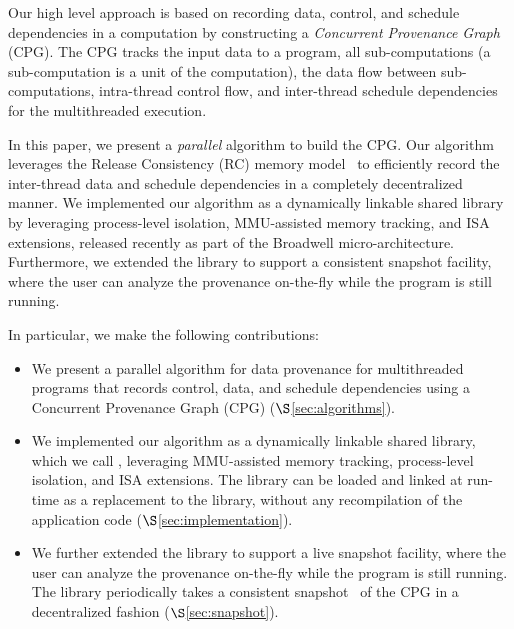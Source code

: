 Our high level approach is based on recording data, control, and schedule dependencies in a computation by constructing a {\em Concurrent Provenance Graph} (CPG). The CPG tracks the input data to a program, all sub-computations (a sub-computation is a unit of the computation), the data flow between sub-computations, intra-thread control flow, and inter-thread schedule dependencies for the multithreaded execution. 


In this paper, we present a {\em parallel} algorithm to build the CPG. Our algorithm leverages the Release Consistency (RC) memory model~\cite{DSM-RC} to efficiently record the inter-thread data and schedule dependencies in a completely decentralized manner. We implemented our algorithm as a dynamically linkable shared library by leveraging process-level isolation, MMU-assisted memory tracking, and \intelpt ISA extensions, released recently as part of the Broadwell micro-architecture.  Furthermore, we extended the library to support a consistent snapshot facility, where the user can analyze the provenance on-the-fly while the program is still running.


In particular, we make the following contributions:
\begin{itemize}

\item We present a parallel algorithm for data provenance for multithreaded programs that records control, data, and schedule dependencies using a Concurrent Provenance Graph (CPG) ($\S$\ref{sec:algorithms}).

\item We implemented our algorithm as a dynamically linkable shared library, which we call \projecttitle, leveraging MMU-assisted memory tracking, process-level isolation, and \intelpt ISA extensions.  The \projecttitle library can be loaded and linked at run-time as a replacement to the \pthreads library, without any recompilation  of the application code ($\S$\ref{sec:implementation}).

\item We further extended the library to support a live snapshot facility, where the user can analyze the provenance on-the-fly while the program is still running. The library periodically takes a consistent snapshot~\cite{chandy-lamport} of the CPG in a decentralized fashion ($\S$\ref{sec:snapshot}).



\end{itemize}




